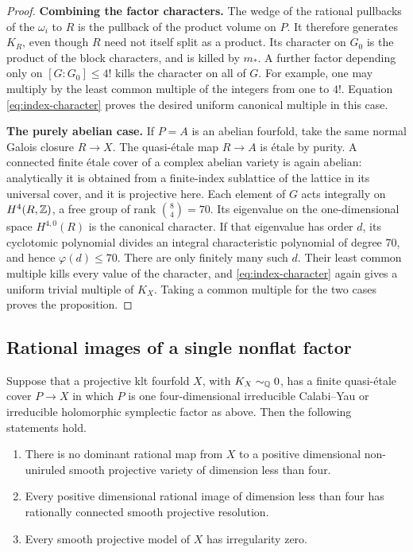 \begin{proof}
\smallskip\noindent\textbf{Combining the factor characters.}
The wedge of the rational pullbacks of the \(\omega_i\) to \(R\) is
the pullback of the product volume on \(P\).  It therefore generates
\(K_R\), even though \(R\) need not itself split as a product.  Its
character on \(G_0\) is the product of the block characters, and is
killed by \(m_*\).  A further factor depending only on
\([G:G_0]\le4!\) kills the character on all of \(G\).  For example,
one may multiply by the least common multiple of the integers from
one to \(4!\).  Equation \eqref{eq:index-character} proves the desired
uniform canonical multiple in this case.

\smallskip\noindent\textbf{The purely abelian case.}
If \(P=A\) is an abelian fourfold, take the same normal Galois closure
\(R\to X\).  The quasi-\'etale map \(R\to A\) is \'etale by purity.
A connected finite \'etale cover of a complex abelian variety is again
abelian: analytically it is obtained from a finite-index sublattice of
the lattice in its universal cover, and it is projective here.  Each
element of \(G\) acts integrally on
\(H^4(R,\mathbb Z)\), a free group of rank \(\binom84=70\).  Its eigenvalue on
the one-dimensional space \(H^{4,0}(R)\) is the canonical character.
If that eigenvalue has order \(d\), its cyclotomic polynomial divides an
integral characteristic polynomial of degree 70, and hence
\(\varphi(d)\le70\).  There are only finitely many such \(d\).  Their
least common multiple kills every value of the character, and
\eqref{eq:index-character} again gives a uniform trivial multiple of
\(K_X\).  Taking a common multiple for the two cases proves the
proposition.
\end{proof}

\subsection{Rational images of a single nonflat factor}

\begin{lemma}\label{lem:index-single-factor-images}
Suppose that a projective klt fourfold \(X\), with \(K_X\sim_{\mathbb Q}0\),
has a finite quasi-\'etale cover \(P\to X\) in which \(P\) is one
four-dimensional irreducible Calabi--Yau or irreducible holomorphic
symplectic factor as above.  Then the following statements hold.
\begin{enumerate}[label=\textup{(\roman*)}]
\item There is no dominant rational map from \(X\) to a positive
dimensional non-uniruled smooth projective variety of dimension less
than four.
\item Every positive dimensional rational image of dimension less
than four has rationally connected smooth projective resolution.
\item Every smooth projective model of \(X\) has irregularity zero.
\end{enumerate}
\end{lemma}

